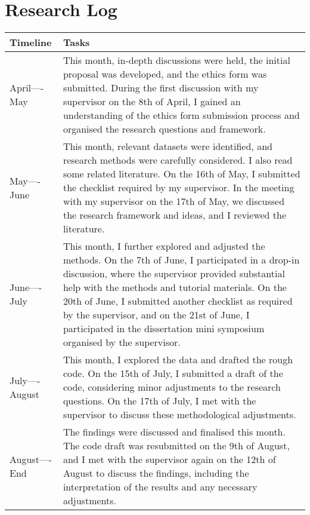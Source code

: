 {}

\appendix
\chapter{Research Log}
\label{appendixlabel1}
\begin{table}[H]
\captionsetup{justification=centering}
\centering
\begin{tabular}{|p{3cm}|p{10cm}|}
\hline
\textbf{Timeline} & \textbf{Tasks} \\
\hline \hline
April----May  & This month, in-depth discussions were held, the initial proposal was developed, and the ethics form was submitted. During the first discussion with my supervisor on the 8th of April, I gained an understanding of the ethics form submission process and organised the research questions and framework. \\
\hline \hline
May----June & This month, relevant datasets were identified, and research methods were carefully considered. I also read some related literature. On the 16th of May, I submitted the checklist required by my supervisor. In the meeting with my supervisor on the 17th of May, we discussed the research framework and ideas, and I reviewed the literature. \\
\hline \hline
June----July & This month, I further explored and adjusted the methods. On the 7th of June, I participated in a drop-in discussion, where the supervisor provided substantial help with the methods and tutorial materials. On the 20th of June, I submitted another checklist as required by the supervisor, and on the 21st of June, I participated in the dissertation mini symposium organised by the supervisor. \\
\hline \hline
July----August & This month, I explored the data and drafted the rough code. On the 15th of July, I submitted a draft of the code, considering minor adjustments to the research questions. On the 17th of July, I met with the supervisor to discuss these methodological adjustments. \\
\hline \hline
August----End & The findings were discussed and finalised this month. The code draft was resubmitted on the 9th of August, and I met with the supervisor again on the 12th of August to discuss the findings, including the interpretation of the results and any necessary adjustments. \\
\hline
\end{tabular}
\end{table}





